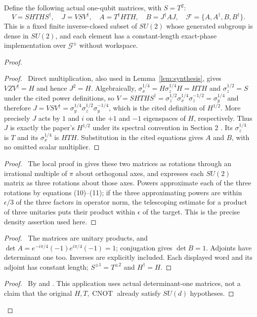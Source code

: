 \begin{lemma}
\label{eqv:su2-set}
Define the following actual one-qubit matrices, with $S=T^2$:
\[
 V=SHTHS^\dagger,\quad J=VSV^\dagger,\quad
 A=T^\dagger HTH,\quad B=J^\dagger A J,
 \quad\mathcal F=\{A,A^\dagger,B,B^\dagger\}.
\]
This is a fixed finite inverse-closed subset of $SU(2)$ whose generated
subgroup is dense in $SU(2)$, and each element has a constant-length exact-phase
implementation over $\mathcal G^{\pm}$ without workspace.
\end{lemma}
\begin{proof}
 \begin{proof}\pf\ Direct multiplication, also used in
 Lemma~\ref{lem:synthesis}, gives $VZV^\dagger=H$ and hence
 $J^2=H$. Algebraically, $\sigma_x^{1/4}=H\sigma_z^{1/4}H=HTH$ and $\sigma_z^{1/2}=S$ under the cited power definitions, so $V=SHTHS^\dagger=\sigma_z^{1/2}\sigma_x^{1/4}\sigma_z^{-1/2}=\sigma_y^{1/4}$ and therefore $J=VSV^\dagger=\sigma_y^{1/4}\sigma_z^{1/2}\sigma_y^{-1/4}$, which is the cited definition of $H^{1/2}$. More precisely $J$ acts by $1$ and $i$ on the $+1$ and
 $-1$ eigenspaces of $H$, respectively. Thus $J$ is exactly the
 paper's $H^{1/2}$ under its spectral convention in Section 2
 \cite[PDF pp.~3--4, power identities preceding Section~3]{BoykinEtAl1999}.
 Its $\sigma_z^{1/4}$ is $T$ and its $\sigma_x^{1/4}$ is $HTH$.
 Substitution in the cited equations gives $A$ and $B$, with no
 omitted scalar multiplier.\end{proof}
 \begin{proof}\pf\ The local proof in
 \cite[Section 3, PDF p.~4, equations (7)--(12)]{BoykinEtAl1999}
 gives these two matrices as rotations through an irrational multiple
 of $\pi$ about orthogonal axes, and expresses each $SU(2)$ matrix
 as three rotations about those axes. Powers approximate each of
 the three rotations by equations (10)--(11); if the three approximating powers are within $\epsilon/3$ of the three factors in operator norm, the telescoping estimate for a product of three unitaries puts their product within $\epsilon$ of the target. This is the
 precise density assertion used here.\end{proof}
 \begin{proof}\pf\ The matrices are unitary products, and
 $\det A=e^{-i\pi/4}(-1)e^{i\pi/4}(-1)=1$;
 conjugation gives $\det B=1$. Adjoints have determinant one too.
 Inverses are explicitly included. Each displayed word and its
 adjoint has constant length; $S^{\pm1}=T^{\pm2}$ and $H^\dagger=H$.
\end{proof}
 \qedstep
 \begin{proof}\pf\ By  and
 . This application uses actual
 determinant-one matrices, not a claim that the original
 $H,T,\operatorname{CNOT}$ already satisfy $SU(d)$ hypotheses.
\end{proof}
\end{proof}

